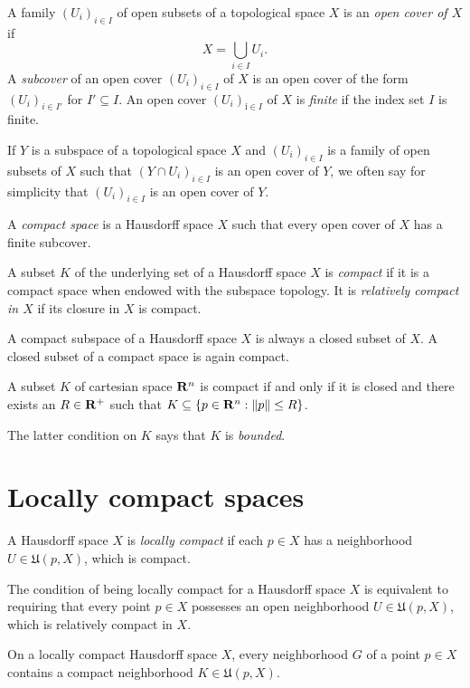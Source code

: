 A family $(U_i)_{i \in I}$ of open subsets of a topological space $X$ is an
\emph{open cover of $X$} if
\[
  X = \bigcup_{i \in I} U_i.
\]
A \emph{subcover} of an open cover $(U_i)_{i \in I}$ of $X$
is an open cover of the form $(U_i)_{i \in I'}$ for $I' \subseteq I$. An open
cover $(U_i)_{í \in I}$ of $X$ is \emph{finite} if the index set $I$ is finite.

If $Y$ is a subspace of a topological space $X$ and $(U_i)_{i \in I}$ is a family
of open subsets of $X$ such that $(Y \cap U_i)_{i \in I}$ is an open cover of
$Y$, we often say for simplicity that $(U_i)_{i \in I}$ is an open cover of $Y$.

\begin{dfn}
  A \emph{compact space} is a Hausdorff space $X$ such that every open cover of
  $X$ has a finite subcover.
\end{dfn}

A subset $K$ of the underlying set of a Hausdorff space $X$ is \emph{compact}
if it is a compact space when endowed with the subspace topology. It is \emph{relatively
compact in $X$} if its closure in $X$ is compact.

A compact subspace of a Hausdorff space $X$ is always a closed subset of $X$. A closed
subset of a compact space is again compact.

\begin{thm}
  A subset $K$ of cartesian space $\mathbf{R}^n$ is compact if and only if it is closed
  and there exists an $R \in \mathbf{R}^+$ such that $K \subseteq \lbrace p \in \mathbf{R}^n : \lVert p\rVert \leq R\rbrace$.
\end{thm}

The latter condition on $K$ says that $K$ is \emph{bounded}.

\section{Locally compact spaces}
\label{sec:locally_compact}

\begin{dfn}
  A Hausdorff space $X$ is \emph{locally compact} if each $p \in X$ has a
  neighborhood $U \in \mathfrak U(p, X)$, which is compact.
\end{dfn}
The condition of being locally compact for a Hausdorff space $X$ is equivalent to
requiring that every point $p \in X$ possesses an open neighborhood $U \in \mathfrak U(p, X)$,
which is relatively compact in $X$.

\begin{prop}
  \label{prop:locally_compact}
  On a locally compact Hausdorff space $X$, every neighborhood $G$ of a point $p \in X$
  contains a compact neighborhood $K \in \mathfrak U(p, X)$.
\end{prop}

